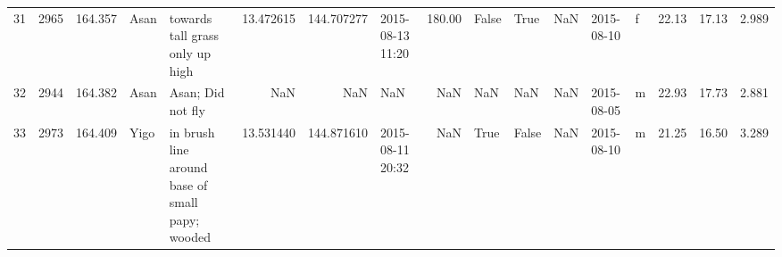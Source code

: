 \begin{tabular}{lrrllrrlrlllllrrr}
31 &       2965 &    164.357 &     Asan &                                                        towards tall grass only up high &  13.472615 &  144.707277 &     2015-08-13 11:20 &                  180.00 &             False &    True &           NaN &       2015-08-10 &   f &   22.13 &  17.13 &   2.989 \\
32 &       2944 &    164.382 &     Asan &                                                                      Asan; Did not fly &        NaN &         NaN &                  NaN &                     NaN &               NaN &     NaN &           NaN &       2015-08-05 &   m &   22.93 &  17.73 &   2.881 \\
33 &       2973 &    164.409 &     Yigo &                                        in brush line around base of small papy; wooded &  13.531440 &  144.871610 &     2015-08-11 20:32 &                     NaN &              True &   False &           NaN &       2015-08-10 &   m &   21.25 &  16.50 &   3.289 \\
\bottomrule
\end{tabular}
